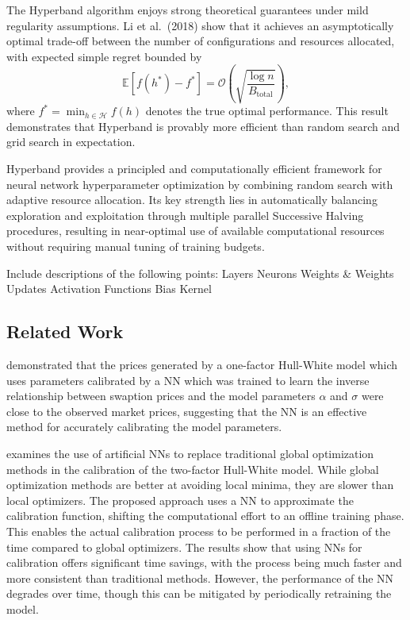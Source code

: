 The Hyperband algorithm enjoys strong theoretical guarantees under mild regularity assumptions. Li et al.\ (2018) show that it achieves an asymptotically optimal trade-off between the number of configurations and resources allocated, with expected simple regret bounded by
\begin{equation}
	\mathbb{E}\left[f(h^*) - f^*\right] = \mathcal{O}\left(\sqrt{\frac{\log n}{B_{\text{total}}}}\right),
	\label{eq:hyperband_regret}
\end{equation}
where $f^* = \min_{h \in \mathcal{H}} f(h)$ denotes the true optimal performance. This result demonstrates that Hyperband is provably more efficient than random search and grid search in expectation.

Hyperband provides a principled and computationally efficient framework for neural network hyperparameter optimization by combining random search with adaptive resource allocation. Its key strength lies in automatically balancing exploration and exploitation through multiple parallel Successive Halving procedures, resulting in near-optimal use of available computational resources without requiring manual tuning of training budgets.


Include descriptions of the following points:
Layers
Neurons
Weights \& Weights Updates
Activation Functions
Bias
Kernel


\subsection{Related Work}
\textcite{alvarez2022hullwhite} demonstrated that the prices generated by a one-factor Hull-White model which uses parameters calibrated by a NN which was trained to learn the inverse relationship between swaption prices and the model parameters $\alpha$ and $\sigma$ were close to the observed market prices, suggesting that the NN is an effective method for accurately calibrating the model parameters.

\textcite{hernandez2016model} examines the use of artificial NNs to replace traditional global optimization methods in the calibration of the two-factor Hull-White model. While global optimization methods are better at avoiding local minima, they are slower than local optimizers. The proposed approach uses a NN to approximate the calibration function, shifting the computational effort to an offline training phase. This enables the actual calibration process to be performed in a fraction of the time compared to global optimizers. The results show that using NNs for calibration offers significant time savings, with the process being much faster and more consistent than traditional methods. However, the performance of the NN degrades over time, though this can be mitigated by periodically retraining the model.


